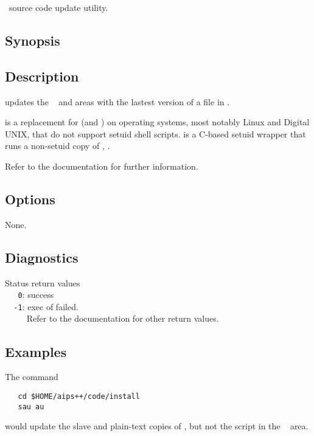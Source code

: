 \aipspp\ source code update utility.

\subsection*{Synopsis}

\begin{synopsis}
\end{synopsis}

\subsection*{Description}

 updates the \aipspp\  and  areas with the
lastest version of a file in .

 is a replacement for  (and )
on operating systems, most notably Linux and Digital UNIX, that do not
support setuid shell scripts.   is a C-based setuid wrapper
that runs a non-setuid copy of , .

Refer to the  documentation for further information.

\subsection*{Options}

None.

\subsection*{Diagnostics}

Status return values
\\ \verb+   0+: success
\\ \verb+  -1+: exec of  failed.
\\ \verb+     +Refer to the  documentation for other return values.

\subsection*{Examples}

The command

\begin{verbatim}
   cd $HOME/aips++/code/install
   sau au
\end{verbatim}

\noindent
would update the slave and plain-text copies of , but not the
script in the \aipspp\  area.

